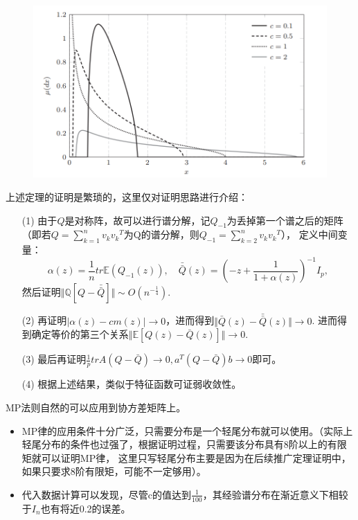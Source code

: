\documentclass[UTF8,12pt]{ctexart}
\begin{document}
\begin{figure}[htbp]
    \centering
    \includegraphics[width=1\textwidth]{MP_law.png}
\end{figure}

上述定理的证明是繁琐的，这里仅对证明思路进行介绍：
\begin{itemize}
    \item[(1)] 由于$Q$是对称阵，故可以进行谱分解，记$Q_{-1}$为丢掉第一个谱之后的矩阵
    （即若$Q = \sum\limits_{k=1}^n v_k {v_k}^T$为Q的谱分解，则$Q_{-1} = \sum\limits_{k=2}^n v_k {v_k}^T$），
    定义中间变量：
    \[
        \alpha (z) = \frac{1}{n} tr \mathbb E (Q_{-1}(z)),\quad \bar{\bar{Q}}(z) = 
        {(-z + \frac{1}{1+\alpha(z)})}^{-1}I_p   , 
    \]
    然后证明$\Vert\mathbb Q [Q - \bar{\bar{Q}}]\Vert \sim O(n^{-\frac{1}{4}})$.
    \item[(2)] 再证明$|\alpha(z) - cm(z)| \rightarrow 0$，进而得到$\Vert\bar Q(z) - \bar{\bar Q}(z)\Vert \rightarrow 0$.
    进而得到确定等价的第三个关系$\Vert\mathbb E [Q(z)-\bar Q(z)]\Vert\rightarrow 0$.
    \item[(3)] 最后再证明$\frac{1}{p} tr A(Q-\bar Q) \rightarrow 0, a^T(Q-\bar Q)b \rightarrow 0$即可。
    \item[(4)] 根据上述结果，类似于特征函数可证弱收敛性。 
\end{itemize}

MP法则自然的可以应用到协方差矩阵上。

\begin{itemize}
    \item MP律的应用条件十分广泛，只需要分布是一个轻尾分布就可以使用。（实际上轻尾分布的条件也过强了，根据证明过程，只需要该分布具有8阶以上的有限矩就可以证明MP律，
    这里只写轻尾分布主要是因为在后续推广定理证明中，如果只要求8阶有限矩，可能不一定够用）。
    \item 代入数据计算可以发现，尽管c的值达到$\frac{1}{100}$，其经验谱分布在渐近意义下相较于$I_n$也有将近0.2的误差。
\end{itemize}
\end{document}
